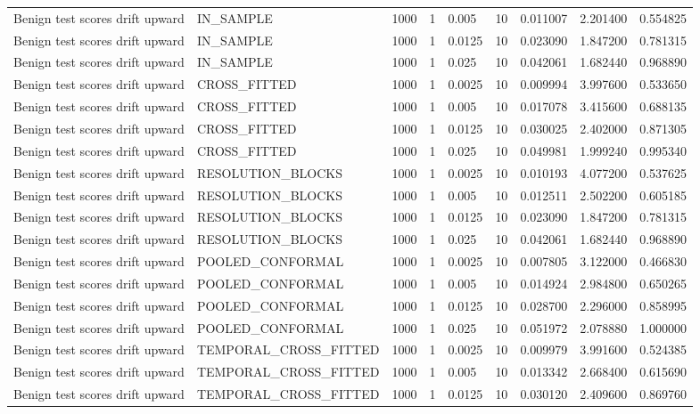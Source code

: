 \begin{tabular}{lllllllll}
Benign test scores drift upward & IN\_SAMPLE & 1000 & 1 & 0.005 & 10 & 0.011007 & 2.201400 & 0.554825 \\
Benign test scores drift upward & IN\_SAMPLE & 1000 & 1 & 0.0125 & 10 & 0.023090 & 1.847200 & 0.781315 \\
Benign test scores drift upward & IN\_SAMPLE & 1000 & 1 & 0.025 & 10 & 0.042061 & 1.682440 & 0.968890 \\
Benign test scores drift upward & CROSS\_FITTED & 1000 & 1 & 0.0025 & 10 & 0.009994 & 3.997600 & 0.533650 \\
Benign test scores drift upward & CROSS\_FITTED & 1000 & 1 & 0.005 & 10 & 0.017078 & 3.415600 & 0.688135 \\
Benign test scores drift upward & CROSS\_FITTED & 1000 & 1 & 0.0125 & 10 & 0.030025 & 2.402000 & 0.871305 \\
Benign test scores drift upward & CROSS\_FITTED & 1000 & 1 & 0.025 & 10 & 0.049981 & 1.999240 & 0.995340 \\
Benign test scores drift upward & RESOLUTION\_BLOCKS & 1000 & 1 & 0.0025 & 10 & 0.010193 & 4.077200 & 0.537625 \\
Benign test scores drift upward & RESOLUTION\_BLOCKS & 1000 & 1 & 0.005 & 10 & 0.012511 & 2.502200 & 0.605185 \\
Benign test scores drift upward & RESOLUTION\_BLOCKS & 1000 & 1 & 0.0125 & 10 & 0.023090 & 1.847200 & 0.781315 \\
Benign test scores drift upward & RESOLUTION\_BLOCKS & 1000 & 1 & 0.025 & 10 & 0.042061 & 1.682440 & 0.968890 \\
Benign test scores drift upward & POOLED\_CONFORMAL & 1000 & 1 & 0.0025 & 10 & 0.007805 & 3.122000 & 0.466830 \\
Benign test scores drift upward & POOLED\_CONFORMAL & 1000 & 1 & 0.005 & 10 & 0.014924 & 2.984800 & 0.650265 \\
Benign test scores drift upward & POOLED\_CONFORMAL & 1000 & 1 & 0.0125 & 10 & 0.028700 & 2.296000 & 0.858995 \\
Benign test scores drift upward & POOLED\_CONFORMAL & 1000 & 1 & 0.025 & 10 & 0.051972 & 2.078880 & 1.000000 \\
Benign test scores drift upward & TEMPORAL\_CROSS\_FITTED & 1000 & 1 & 0.0025 & 10 & 0.009979 & 3.991600 & 0.524385 \\
Benign test scores drift upward & TEMPORAL\_CROSS\_FITTED & 1000 & 1 & 0.005 & 10 & 0.013342 & 2.668400 & 0.615690 \\
Benign test scores drift upward & TEMPORAL\_CROSS\_FITTED & 1000 & 1 & 0.0125 & 10 & 0.030120 & 2.409600 & 0.869760 \\

\end{tabular}
